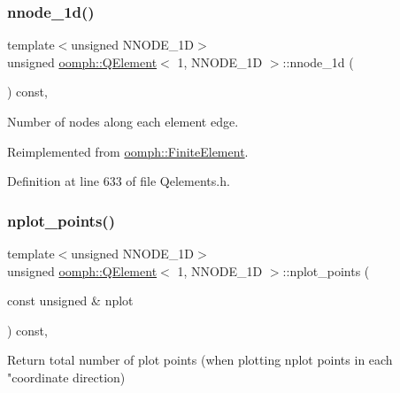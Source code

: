 \subsubsection{\texorpdfstring{nnode\+\_\+1d()}{nnode\_1d()}}
{\footnotesize\ttfamily template$<$unsigned N\+N\+O\+D\+E\+\_\+1D$>$ \\
unsigned \hyperlink{classoomph_1_1QElement}{oomph\+::\+Q\+Element}$<$ 1, N\+N\+O\+D\+E\+\_\+1D $>$\+::nnode\+\_\+1d (\begin{DoxyParamCaption}{ }\end{DoxyParamCaption}) const\hspace{0.3cm}{\ttfamily [inline]}, {\ttfamily [virtual]}}



Number of nodes along each element edge. 



Reimplemented from \hyperlink{classoomph_1_1FiniteElement_ab65c7a94dda80c1876a09ac12be4e39c}{oomph\+::\+Finite\+Element}.



Definition at line 633 of file Qelements.\+h.

\mbox{\label{classoomph_1_1QElement_3_011_00_01NNODE__1D_01_4_ae0c506f7c36b9b667d4058bf9eaa11f7}} 
\subsubsection{\texorpdfstring{nplot\+\_\+points()}{nplot\_points()}}
{\footnotesize\ttfamily template$<$unsigned N\+N\+O\+D\+E\+\_\+1D$>$ \\
unsigned \hyperlink{classoomph_1_1QElement}{oomph\+::\+Q\+Element}$<$ 1, N\+N\+O\+D\+E\+\_\+1D $>$\+::nplot\+\_\+points (\begin{DoxyParamCaption}\item[{const unsigned \&}]{nplot }\end{DoxyParamCaption}) const\hspace{0.3cm}{\ttfamily [inline]}, {\ttfamily [virtual]}}



Return total number of plot points (when plotting nplot points in each "coordinate direction) 



